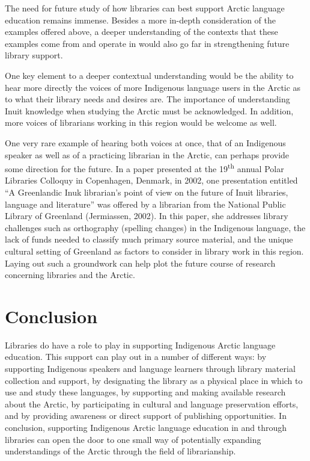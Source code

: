 \documentclass[a4paper,
fontsize=11pt,
oneside,
numbers=noperiodatend,
parskip=half-,
bibliography=totoc,
final
]{scrartcl}
\begin{document}
The need for future study of how libraries can best support Arctic
language education remains immense. Besides a more in-depth
consideration of the examples offered above, a deeper understanding of
the contexts that these examples come from and operate in would also go
far in strengthening future library support.

One key element to a deeper contextual understanding would be the
ability to hear more directly the voices of more Indigenous language
users in the Arctic as to what their library needs and desires are. The
importance of understanding Inuit knowledge when studying the Arctic
must be acknowledged. In addition, more voices of librarians working in
this region would be welcome as well.

One very rare example of hearing both voices at once, that of an
Indigenous speaker as well as of a practicing librarian in the Arctic,
can perhaps provide some direction for the future. In a paper presented
at the 19\textsuperscript{th} annual Polar Libraries Colloquy in
Copenhagen, Denmark, in 2002, one presentation entitled \enquote{A
Greenlandic Inuk librarian's point of view on the future of Inuit
libraries, language and literature} was offered by a librarian from the
National Public Library of Greenland (Jermiassen, 2002). In this paper,
she addresses library challenges such as orthography (spelling changes)
in the Indigenous language, the lack of funds needed to classify much
primary source material, and the unique cultural setting of Greenland as
factors to consider in library work in this region. Laying out such a
groundwork can help plot the future course of research concerning
libraries and the Arctic.

\hypertarget{conclusion}{%
\section{Conclusion}\label{conclusion}}

Libraries do have a role to play in supporting Indigenous Arctic
language education. This support can play out in a number of different
ways: by supporting Indigenous speakers and language learners through
library material collection and support, by designating the library as a
physical place in which to use and study these languages, by supporting
and making available research about the Arctic, by participating in
cultural and language preservation efforts, and by providing awareness
or direct support of publishing opportunities. In conclusion, supporting
Indigenous Arctic language education in and through libraries can open
the door to one small way of potentially expanding understandings of the
Arctic through the field of librarianship.
\end{document}
